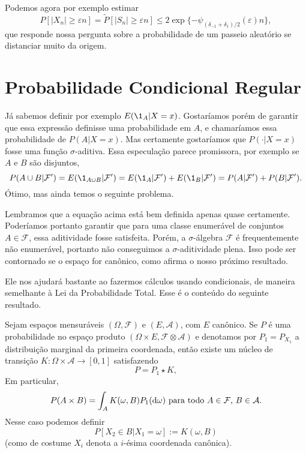 Podemos agora por exemplo estimar
\begin{equation}
  P[|X_n| \geq \varepsilon n] = \tilde P [|S_n| \geq \varepsilon n] \leq 2 \exp \{- \psi_{(\delta_{-1} + \delta_1)/2}(\varepsilon) n\},
\end{equation}
que responde nossa pergunta sobre a probabilidade de um passeio aleatório se distanciar muito da origem.



\section{Probabilidade Condicional Regular}

Já sabemos definir por exemplo $E(\1_A|X = x)$.
Gostaríamos porém de garantir que essa expressão definisse uma probabilidade em $A$, e chamaríamos essa probabilidade de $P(A|X = x)$.
Mas certamente gostaríamos que $P(\cdot|X = x)$ fosse uma função $\sigma$-aditiva.
Essa especulação parece promissora, por exemplo se $A$ e $B$ são disjuntos,
\begin{equation*}
  P(A \cup B |\mathcal{F}') = E(\1_{A \cup B} | \mathcal{F}') = E(\1_A|\mathcal{F}') + E(\1_{B}|\mathcal{F}') = P(A|\mathcal{F}') + P(B|\mathcal{F}').
\end{equation*}
Ótimo, mas ainda temos o seguinte problema.

Lembramos que a equação acima está bem definida apenas quase certamente.
Poderíamos portanto garantir que para uma classe enumerável de conjuntos $A \in \mathcal{F}$, essa aditividade fosse satisfeita.
Porém, a $\sigma$-álgebra $\mathcal{F}$ é frequentemente não enumerável, portanto não conseguimos a $\sigma$-aditividade plena.
Isso pode ser contornado se o espaço for canônico, como afirma o nosso próximo resultado.

Ele nos ajudará bastante ao fazermos cálculos usando condicionais, de maneira semelhante à Lei da Probabilidade Total.
Esse é o conteúdo do seguinte resultado.

\begin{theorem} 
  \label{desintegracao}
  Sejam espaços mensuráveis $(\Omega, \mathcal{F})$ e $(E, \mathcal{A})$, com $E$ canônico.
  Se $P$ é uma probabilidade no espaço produto $(\Omega \times E, \mathcal{F} \otimes \mathcal{A})$ e denotamos por $P_1 = P_{X_1}$ a 
  distribuição marginal da primeira coordenada, então existe um núcleo de transição $K: \Omega \times \mathcal{A} \to [0,1]$ satisfazendo
  \begin{equation}
    P = P_1 \star K,
  \end{equation}
  Em particular,
  \begin{equation}
    \label{e:prob_cond_reg_prod}
    P(A \times B) = \int_A K(\omega, B) P_1 (\mathop{}\!\mathrm{d} \omega) \text{ para todo $A \in \mathcal{F}$, $B \in \mathcal{A}$}.
  \end{equation}
 Nesse caso podemos definir 
 $$P[X_2 \in B | X_1 = \omega]:=K(\omega, B)$$ 
 (como de costume $X_i$ denota a $i$-ésima coordenada canônica).
\end{theorem}

